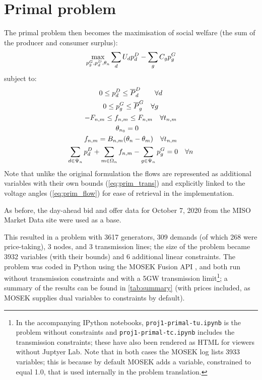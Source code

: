 \documentclass[11pt,a4paper]{article}
\numberwithin{equation}{section}
\begin{document}
\section{Primal problem}
\label{sec:primal}

The primal problem then becomes the maximisation of social welfare (the sum of the producer and consumer surplus):
\begin{equation}
\max_{p^G_g,p^D_d,\theta_n} \sum_d U_d p^D_d - \sum_g C_g p^G_g 
\end{equation}
subject to:
\begin{gather}
0 \leq p^D_d \leq \overline{P}^D_d \quad \quad \forall d \label{eq:prim_demand} \\
0 \leq p^G_g \leq \overline{P}^G_g \quad \forall g \label{eq:prim_supply} \\
-F_{n,m}  \leq f_{n,m} \leq F_{n,m} \quad \forall t_{n,m} \label{eq:prim_trans}\\
\theta_{n_0} = 0 \quad \label{eq:prim_ref_theta} \\
f_{n,m} = B_{n,m}(\theta_n - \theta_m) \quad \forall t_{n,m} \label{eq:prim_flow} \\
\sum_{d \in \Psi_n} p^D_d + \sum_{m \in \Omega_n} f_{n,m} - \sum_{g \in \Psi_n} p^G_g = 0 \quad \forall n \label{eq:prim_balance}
\end{gather}
Note that unlike the original formulation the flows are represented as additional variables with their own bounds (\cref{eq:prim_trans}) and explicitly linked to the voltage angles (\cref{eq:prim_flow}) for ease of retrieval in the implementation.


As before, the day-ahead bid and offer data for October 7, 2020 from the MISO Market Data site \cite{MISOMarketData} were used as a base.

This resulted in a problem with 3617 generators, 309 demands (of which 268 were price-taking), 3 nodes, and 3 transmission lines; the size of the problem became 3932 variables (with their bounds) and 6 additional linear constraints.
The problem was coded in Python using the MOSEK Fusion API \cite{mosekapsMOSEKFusionAPI2021}, and both run without transmission constraints and with a 5GW transmission limit\footnote{
In the accompanying IPython notebooks, \texttt{proj1-primal-tu.ipynb} is the problem without constraints and \texttt{proj1-primal-tc.ipynb} includes the transmission constraints; these have also been rendered as HTML for viewers without Juptyer Lab.
Note that in both cases the MOSEK log lists 3933 variables; this is because by default MOSEK adds a variable, constrained to equal 1.0, that is used internally in the problem translation.
}; a summary of the results can be found in \cref{tab:summary} (with prices included, as MOSEK supplies dual variables to constraints by default).
\end{document}
